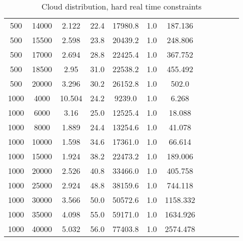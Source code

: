 \begin{table}[htb]
\begin{tabular}{|c|c|c|c|c|c|c|c|c|c|c|c|}
		500 & 14000 & 2.122 & 22.4 & 17980.8 & 1.0 & 187.136 & & & & &  \\ 
		500 & 15500 & 2.598 & 23.8 & 20439.2 & 1.0 & 248.806 & & & & &  \\ 
		500 & 17000 & 2.694 & 28.8 & 22425.4 & 1.0 & 367.752 & & & & &  \\ 
		500 & 18500 & 2.95 & 31.0 & 22538.2 & 1.0 & 455.492 & & & & &  \\ 
		500 & 20000 & 3.296 & 30.2 & 26152.8 & 1.0 & 502.0 & & & & &  \\ 
		1000 & 4000 & 10.504 & 24.2 & 9239.0 & 1.0 & 6.268 & & & & &  \\ 
		1000 & 6000 & 3.16 & 25.0 & 12525.4 & 1.0 & 18.088 & & & & &  \\ 
		1000 & 8000 & 1.889 & 24.4 & 13254.6 & 1.0 & 41.078 & & & & &  \\ 
		1000 & 10000 & 1.598 & 34.6 & 17361.0 & 1.0 & 66.614 & & & & &  \\ 
		1000 & 15000 & 1.924 & 38.2 & 22473.2 & 1.0 & 189.006 & & & & &  \\ 
		1000 & 20000 & 2.526 & 40.8 & 33466.0 & 1.0 & 405.758 & & & & &  \\ 
		1000 & 25000 & 2.924 & 48.8 & 38159.6 & 1.0 & 744.118 & & & & &  \\ 
		1000 & 30000 & 3.566 & 50.0 & 50572.6 & 1.0 & 1158.332 & & & & &  \\ 
		1000 & 35000 & 4.098 & 55.0 & 59171.0 & 1.0 & 1634.926 & & & & &  \\ 
		1000 & 40000 & 5.032 & 56.0 & 77403.8 & 1.0 & 2574.478 & & & & &  \\ 
		\hline 
	\end{tabular} 
	\caption{Cloud distribution, hard real time constraints} 
	\label{tab:cloud_hard} 
\end{table} 

